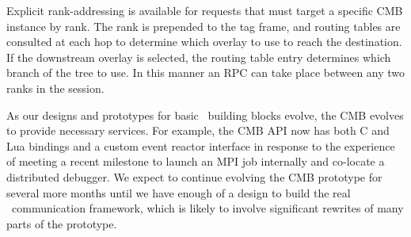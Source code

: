 Explicit rank-addressing is available for requests that must target a
specific CMB instance by rank.  The rank is prepended to the tag frame,
and routing tables are consulted at each hop to determine which overlay
to use to reach the destination.  If the downstream overlay is selected,
the routing table entry determines which branch of the tree to use.
In this manner an RPC can take place between any two ranks in the session.

As our designs and prototypes for basic \flux\ building blocks evolve,
the CMB evolves to provide necessary services.  For example, the CMB API
now has both C and Lua bindings and a custom event reactor interface in
response to the experience of meeting a recent milestone to launch an
MPI job internally and co-locate a distributed debugger.  We expect
to continue evolving the CMB prototype for several more months until
we have enough of a design to build the real \flux\ communication
framework, which is likely to involve significant rewrites of many
parts of the prototype.
